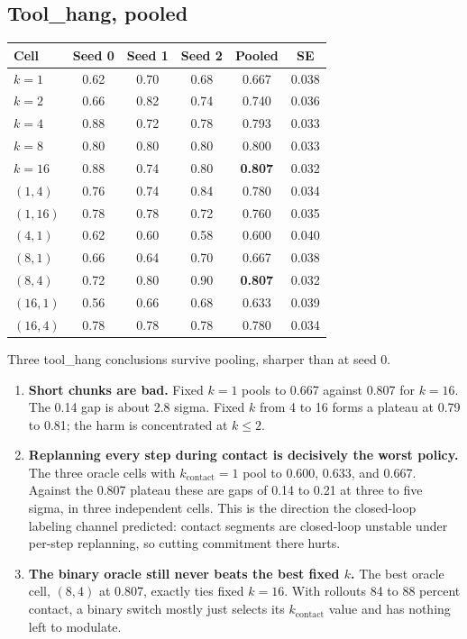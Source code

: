 \documentclass[11pt]{article}
\begin{document}
\subsection{Tool\_hang, pooled}

\begin{center}
\small
\begin{tabular}{@{}lccccc@{}}
\toprule
Cell & Seed 0 & Seed 1 & Seed 2 & Pooled & SE \\
\midrule
$k{=}1$  & 0.62 & 0.70 & 0.68 & 0.667 & 0.038 \\
$k{=}2$  & 0.66 & 0.82 & 0.74 & 0.740 & 0.036 \\
$k{=}4$  & 0.88 & 0.72 & 0.78 & 0.793 & 0.033 \\
$k{=}8$  & 0.80 & 0.80 & 0.80 & 0.800 & 0.033 \\
$k{=}16$ & 0.88 & 0.74 & 0.80 & \textbf{0.807} & 0.032 \\
\midrule
$(1,4)$  & 0.76 & 0.74 & 0.84 & 0.780 & 0.034 \\
$(1,16)$ & 0.78 & 0.78 & 0.72 & 0.760 & 0.035 \\
$(4,1)$  & 0.62 & 0.60 & 0.58 & 0.600 & 0.040 \\
$(8,1)$  & 0.66 & 0.64 & 0.70 & 0.667 & 0.038 \\
$(8,4)$  & 0.72 & 0.80 & 0.90 & \textbf{0.807} & 0.032 \\
$(16,1)$ & 0.56 & 0.66 & 0.68 & 0.633 & 0.039 \\
$(16,4)$ & 0.78 & 0.78 & 0.78 & 0.780 & 0.034 \\
\bottomrule
\end{tabular}
\end{center}

Three tool\_hang conclusions survive pooling, sharper than at seed 0.

\begin{enumerate}[leftmargin=1.6em]
\item \textbf{Short chunks are bad.} Fixed $k{=}1$ pools to 0.667 against 0.807
for $k{=}16$. The 0.14 gap is about 2.8 sigma. Fixed $k$ from 4 to 16 forms a
plateau at 0.79 to 0.81; the harm is concentrated at $k{\leq}2$.
\item \textbf{Replanning every step during contact is decisively the worst
policy.} The three oracle cells with $k_{\mathrm{contact}}{=}1$ pool to 0.600,
0.633, and 0.667. Against the 0.807 plateau these are gaps of 0.14 to 0.21 at
three to five sigma, in three independent cells. This is the direction the
closed-loop labeling channel predicted: contact segments are closed-loop unstable
under per-step replanning, so cutting commitment there hurts.
\item \textbf{The binary oracle still never beats the best fixed $k$.} The best
oracle cell, $(8,4)$ at 0.807, exactly ties fixed $k{=}16$. With rollouts 84 to 88
percent contact, a binary switch mostly just selects its $k_{\mathrm{contact}}$
value and has nothing left to modulate.
\end{enumerate}
\end{document}
